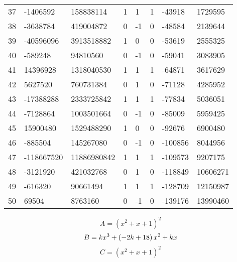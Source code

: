 \documentclass{amsart}
\begin{document}
\begin{longtable}{|l|l|l|lllll|}
37&-1406592&158838114&1&1&1&-43918&1729595\\
38&-3638784&419004872&0&-1&0&-48584&2139644\\
39&-40596096&3913518882&1&0&0&-53619&2555325\\
40&-589248&94810560&0&-1&0&-59041&3083905\\
41&14396928&1318040530&1&1&1&-64871&3617629\\
42&5627520&760731384&0&1&0&-71128&4285952\\
43&-17388288&2333725842&1&1&1&-77834&5036051\\
44&-7128864&1003501664&0&-1&0&-85009&5959425\\
45&15900480&1529488290&1&0&0&-92676&6900480\\
46&-885504&145267080&0&-1&0&-100856&8044956\\
47&-118667520&11886980842&1&1&1&-109573&9207175\\
48&-3121920&421032768&0&1&0&-118849&10606271\\
49&-616320&90661494&1&1&1&-128709&12150987\\
50&69504&8763160&0&-1&0&-139176&13990460\\
\hline
\end{longtable}
$$A=(x^2
 + x
 + 1)^{2}$$
$$B=k\*x^3
 + \left(-2\*k
 + 18\right) \*x^2
 + k\*x$$
$$C=(x^2
 + x
 + 1)^{2}$$
\end{document}
